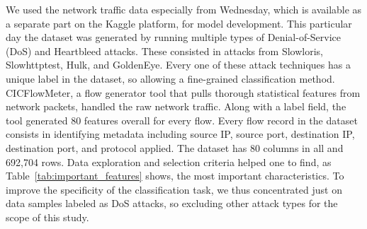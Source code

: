 \documentclass[conference]{IEEEtran}
\begin{document}
We used the network traffic data especially from Wednesday, which is available as a separate part on the Kaggle platform, for model development. This particular day the dataset was generated by running multiple types of Denial-of-Service (DoS) and Heartbleed attacks. These consisted in attacks from Slowloris, Slowhttptest, Hulk, and GoldenEye. Every one of these attack techniques has a unique label in the dataset, so allowing a fine-grained classification method. CICFlowMeter, a flow generator tool that pulls thorough statistical features from network packets, handled the raw network traffic. Along with a label field, the tool generated 80 features overall for every flow. Every flow record in the dataset consists in identifying metadata including source IP, source port, destination IP, destination port, and protocol applied. The dataset has 80 columns in all and 692{,}704 rows. Data exploration and selection criteria helped one to find, as Table~\ref{tab:important_features} shows, the most important characteristics. To improve the specificity of the classification task, we thus concentrated just on data samples labeled as DoS attacks, so excluding other attack types for the scope of this study.
\begin{table}[htbp]
\caption{Most Important Features for Each Attack Label ~\cite{13}}
\label{tab:important_features}
\centering
\renewcommand{\arraystretch}{1.5}  %
\end{table}
\end{document}

